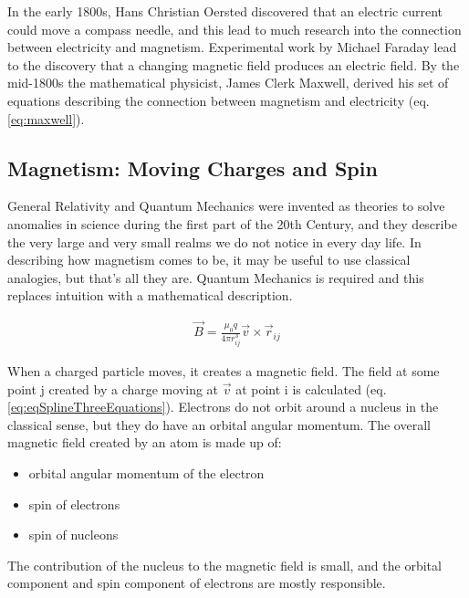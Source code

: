 In the early 1800s, Hans Christian Oersted discovered that an electric current could move a compass needle, and this lead to much research into the connection between electricity and magnetism.  Experimental work by Michael Faraday lead to the discovery that a changing magnetic field produces an electric field.  By the mid-1800s the mathematical physicist, James Clerk Maxwell, derived his set of equations describing the connection between magnetism and electricity (eq. \ref{eq:maxwell}). 


\subsection{Magnetism: Moving Charges and Spin}

General Relativity and Quantum Mechanics were invented as theories to solve anomalies in science during the first part of the 20th Century, and they describe the very large and very small realms we do not notice in every day life.  In describing how magnetism comes to be, it may be useful to use classical analogies, but that's all they are.  Quantum Mechanics is required and this replaces intuition with a mathematical description.

\begin{equation}
\begin{split}
\vec{B} = \frac{\mu_0 q}{4 \pi r_{ij}^3} \vec{v} \times \vec{r}_{ij}
\end{split}
\label{eq:eqSplineThreeEquations}
\end{equation}

When a charged particle moves, it creates a magnetic field.  The field at some point j created by a charge moving at $\vec{v}$ at point i is calculated (eq. \ref{eq:eqSplineThreeEquations}).  Electrons do not orbit around a nucleus in the classical sense, but they do have an orbital angular momentum.  The overall magnetic field created by an atom is made up of:

\begin{itemize}
  \item orbital angular momentum of the electron
  \item spin of electrons
  \item spin of nucleons 
\end{itemize}

The contribution of the nucleus to the magnetic field is small, and the orbital component and spin component of electrons are mostly responsible.



